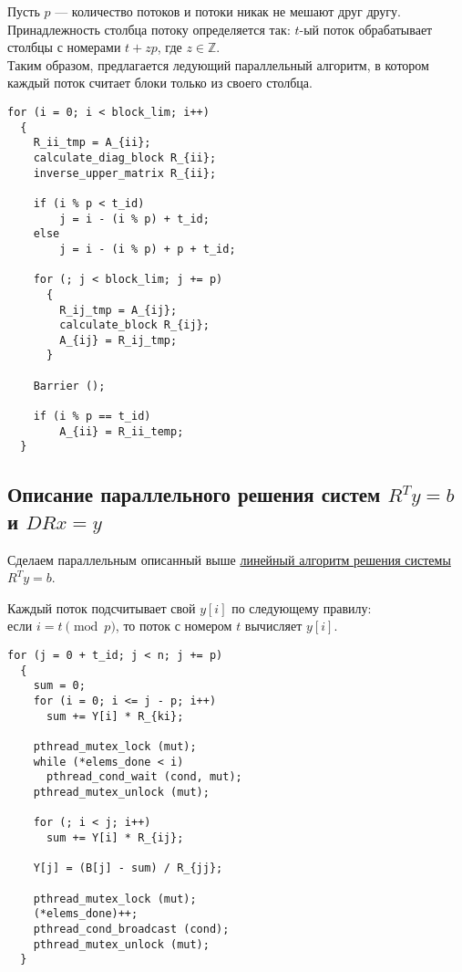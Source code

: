 \documentclass[a4paper,12pt]{article}
\begin{document}
    Пусть $p$ --- количество потоков и потоки никак не мешают друг другу. 
    Принадлежность столбца потоку определяется так:
    $t$-ый поток обрабатывает столбцы с номерами $t + zp$, где $z \in \mathbb{Z}$. \\
    
    Таким образом, предлагается 
    \hypertarget{paral_alg}{ледующий параллельный алгоритм}, 
    в котором каждый поток считает блоки только из своего столбца. 

\begin{verbatim}
for (i = 0; i < block_lim; i++)
  {
    R_ii_tmp = A_{ii};
    calculate_diag_block R_{ii};
    inverse_upper_matrix R_{ii};
    
    if (i % p < t_id)
        j = i - (i % p) + t_id;
    else
        j = i - (i % p) + p + t_id;
        
    for (; j < block_lim; j += p)
      {
        R_ij_tmp = A_{ij};
        calculate_block R_{ij};
        A_{ij} = R_ij_tmp;
      }
    
    Barrier ();
    
    if (i % p == t_id)
        A_{ii} = R_ii_temp;
  }
\end{verbatim}

\newpage
\subsection{Описание параллельного решения систем $R^T y = b$ и $DRx = y$}
    Сделаем параллельным описанный выше 
    \hyperlink{calc_y}{линейный алгоритм решения системы $R^T y = b$}.   
    
    Каждый поток подсчитывает свой $y[i]$ по следующему правилу:\\
    если $i = t \pmod{p}$, то поток с номером $t$ вычисляет $y[i]$.

\begin{verbatim}
for (j = 0 + t_id; j < n; j += p)
  {
    sum = 0;
    for (i = 0; i <= j - p; i++)
      sum += Y[i] * R_{ki};
        
    pthread_mutex_lock (mut);
    while (*elems_done < i)
      pthread_cond_wait (cond, mut);
    pthread_mutex_unlock (mut);
      
    for (; i < j; i++)
      sum += Y[i] * R_{ij};

    Y[j] = (B[j] - sum) / R_{jj};
      
    pthread_mutex_lock (mut);
    (*elems_done)++;
    pthread_cond_broadcast (cond);
    pthread_mutex_unlock (mut);
  }
\end{verbatim}
\end{document}
